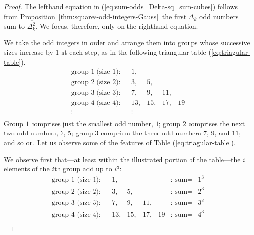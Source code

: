 \begin{proof}
The lefthand equation in (\ref{eq:sum-odds=Delta-sq=sum-cubes}) follows from 
Proposition~\ref{thm:squares-odd-integers-Gauss}: the first $\Delta_k$ odd numbers sum
to $\Delta_k^2$.  We focus, therefore, only on the righthand equation.

\medskip

We take the odd integers in order and arrange them into groups whose successive sizes increase by $1$ at each step, as in the following triangular table (\ref{eq:triagular-table}).
\begin{equation}
\label{eq:triagular-table}
\begin{array}{llrrrrclcc}
\mbox{group $1$ (size $1$):} & &
1,  &    &     &      \\
\mbox{group $2$ (size $2$):} & &
3,  &  5, &     &      \\
\mbox{group $3$ (size $3$):} & &
7,  &  9, & 11, &     \\
\mbox{group $4$ (size $4$):} & &
13, & 15, & 17, & 19   \\
\vdots & & \vdots \\
\end{array}
\end{equation}
Group $1$ comprises just the smallest odd number, $1$; group $2$ comprises the next two odd numbers, $3$, $5$; group $3$ comprises the three odd numbers $7$,  $9$,  and $11$; and so on.  Let us observe some of the features of Table (\ref{eq:triagular-table}).

We observe first that---at least within the illustrated portion of the table---the $i$ elements of the $i$th group add up to $i^3$:
\[
\begin{array}{llrrrrclcc}
\mbox{group $1$ (size $1$):} & &
1,  &    &     &     & \mbox{: sum} = &  1^3 \\
\mbox{group $2$ (size $2$):} & &
3,  &  5, &     &    & \mbox{: sum} =  &  2^3 \\
\mbox{group $3$ (size $3$):} & &
7,  &  9, & 11, &    &  \mbox{: sum} = &  3^3 \\
\mbox{group $4$ (size $4$):} & &
13, & 15, & 17, & 19 & \mbox{: sum} =  &  4^3 \\
\end{array}
\]


\end{proof}
